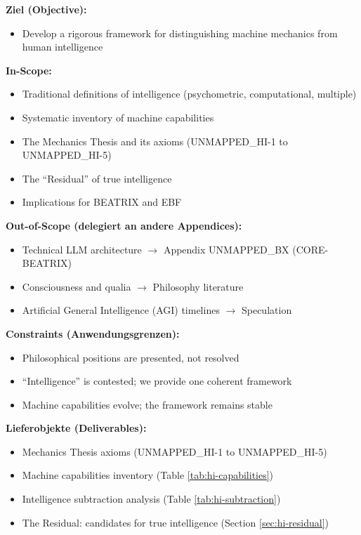 \begin{tcolorbox}[
    colback=orange!5!white,
    colframe=orange!75!black,
    title={\textbf{Appendix Scope: Ziel / In-Scope / Out-of-Scope / Constraints}},
    fonttitle=\bfseries
]

\textbf{Ziel (Objective):}
\begin{itemize}[nosep]
    \item Develop a rigorous framework for distinguishing machine mechanics from human intelligence
\end{itemize}

\textbf{In-Scope:}
\begin{itemize}[nosep]
    \item Traditional definitions of intelligence (psychometric, computational, multiple)
    \item Systematic inventory of machine capabilities
    \item The Mechanics Thesis and its axioms (UNMAPPED_HI-1 to UNMAPPED_HI-5)
    \item The ``Residual'' of true intelligence
    \item Implications for BEATRIX and EBF
\end{itemize}

\textbf{Out-of-Scope (delegiert an andere Appendices):}
\begin{itemize}[nosep]
    \item Technical LLM architecture $\rightarrow$ Appendix UNMAPPED_BX (CORE-BEATRIX)
    \item Consciousness and qualia $\rightarrow$ Philosophy literature
    \item Artificial General Intelligence (AGI) timelines $\rightarrow$ Speculation
\end{itemize}

\textbf{Constraints (Anwendungsgrenzen):}
\begin{itemize}[nosep]
    \item Philosophical positions are presented, not resolved
    \item ``Intelligence'' is contested; we provide one coherent framework
    \item Machine capabilities evolve; the framework remains stable
\end{itemize}

\textbf{Lieferobjekte (Deliverables):}
\begin{itemize}[nosep]
    \item Mechanics Thesis axioms (UNMAPPED_HI-1 to UNMAPPED_HI-5)
    \item Machine capabilities inventory (Table \ref{tab:hi-capabilities})
    \item Intelligence subtraction analysis (Table \ref{tab:hi-subtraction})
    \item The Residual: candidates for true intelligence (Section \ref{sec:hi-residual})
\end{itemize}

\end{tcolorbox}


